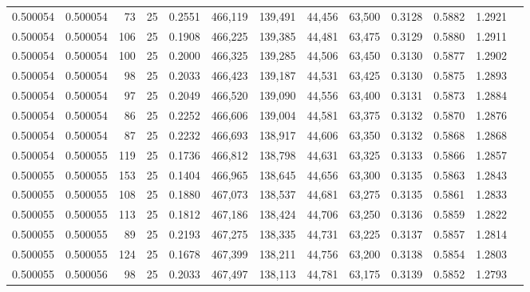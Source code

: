 \begin{tabular}{rrrrrrrrrrrrr}
0.500054 & 0.500054 &    73 &  25 &                                     0.2551 & 466,119 & 139,491 &  44,456 &  63,500 & 0.3128 & 0.5882 & 1.2921 \\
0.500054 & 0.500054 &   106 &  25 &                                     0.1908 & 466,225 & 139,385 &  44,481 &  63,475 & 0.3129 & 0.5880 & 1.2911 \\
0.500054 & 0.500054 &   100 &  25 &                                     0.2000 & 466,325 & 139,285 &  44,506 &  63,450 & 0.3130 & 0.5877 & 1.2902 \\
0.500054 & 0.500054 &    98 &  25 &                                     0.2033 & 466,423 & 139,187 &  44,531 &  63,425 & 0.3130 & 0.5875 & 1.2893 \\
0.500054 & 0.500054 &    97 &  25 &                                     0.2049 & 466,520 & 139,090 &  44,556 &  63,400 & 0.3131 & 0.5873 & 1.2884 \\
0.500054 & 0.500054 &    86 &  25 &                                     0.2252 & 466,606 & 139,004 &  44,581 &  63,375 & 0.3132 & 0.5870 & 1.2876 \\
0.500054 & 0.500054 &    87 &  25 &                                     0.2232 & 466,693 & 138,917 &  44,606 &  63,350 & 0.3132 & 0.5868 & 1.2868 \\
0.500054 & 0.500055 &   119 &  25 &                                     0.1736 & 466,812 & 138,798 &  44,631 &  63,325 & 0.3133 & 0.5866 & 1.2857 \\
0.500055 & 0.500055 &   153 &  25 &                                     0.1404 & 466,965 & 138,645 &  44,656 &  63,300 & 0.3135 & 0.5863 & 1.2843 \\
0.500055 & 0.500055 &   108 &  25 &                                     0.1880 & 467,073 & 138,537 &  44,681 &  63,275 & 0.3135 & 0.5861 & 1.2833 \\
0.500055 & 0.500055 &   113 &  25 &                                     0.1812 & 467,186 & 138,424 &  44,706 &  63,250 & 0.3136 & 0.5859 & 1.2822 \\
0.500055 & 0.500055 &    89 &  25 &                                     0.2193 & 467,275 & 138,335 &  44,731 &  63,225 & 0.3137 & 0.5857 & 1.2814 \\
0.500055 & 0.500055 &   124 &  25 &                                     0.1678 & 467,399 & 138,211 &  44,756 &  63,200 & 0.3138 & 0.5854 & 1.2803 \\
0.500055 & 0.500056 &    98 &  25 &                                     0.2033 & 467,497 & 138,113 &  44,781 &  63,175 & 0.3139 & 0.5852 & 1.2793 \\

\end{tabular}
